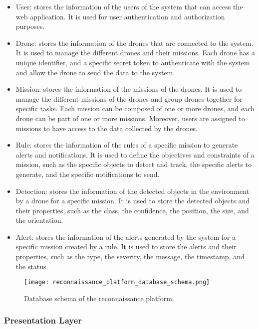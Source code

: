 \begin{itemize}
  \item User: stores the information of the users of the system that can access the web application. It is used for user authentication and authorization purposes.

  \item Drone: stores the information of the drones that are connected to the system. It is used to manage the different drones and their missions. Each drone has a unique identifier, and a specific secret token to authenticate with the system and allow the drone to send the data to the system.

  \item Mission: stores the information of the missions of the drones. It is used to manage the different missions of the drones and group drones together for specific tasks. Each mission can be composed of one or more drones, and each drone can be part of one or more missions. Moreover, users are assigned to missions to have access to the data collected by the drones.

  \item Rule: stores the information of the rules of a specific mission to generate alerts and notifications. It is used to define the objectives and constraints of a mission, such as the specific objects to detect and track, the specific alerts to generate, and the specific notifications to send.

  \item Detection: stores the information of the detected objects in the environment by a drone for a specific mission. It is used to store the detected objects and their properties, such as the class, the confidence, the position, the size, and the orientation.

  \item Alert: stores the information of the alerts generated by the system for a specific mission created by a rule. It is used to store the alerts and their properties, such as the type, the severity, the message, the timestamp, and the status.
\end{itemize}

\begin{figure}
  \texttt{[image: reconnaissance\_platform\_database\_schema.png]}
  \caption{Database schema of the reconnaissance platform.}\label{fig:database_schema}
\end{figure}

\subsubsection{Presentation Layer}\label{subsubsec:implementation_presentation_layer}


